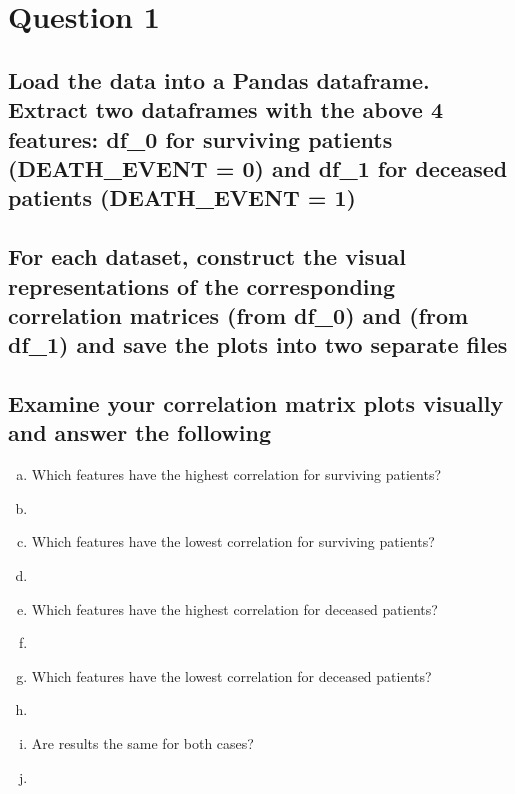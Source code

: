 \documentclass[../../assignment4.tex]{subfiles}
\begin{document}
    \section{Question 1} \label{sec:question1}


    \subsection{Load the data into a Pandas dataframe. Extract two dataframes with the above 4 features: df\_0 for surviving patients (DEATH\_EVENT = 0) and df\_1 for deceased patients (DEATH\_EVENT = 1)} \label{subsec:question1.1}


    \subsection{For each dataset, construct the visual representations of the corresponding correlation matrices  (from df\_0) and  (from df\_1) and save the plots into two separate files} \label{subsec:question1.2}


    \subsection{Examine your correlation matrix plots visually and answer the following} \label{subsec:question1.3}


    \begin{enumerate}[(a)]
        \item Which features have the highest correlation for surviving patients?
        \item[] 
        \item Which features have the lowest correlation for surviving patients?
        \item[] 
        \item Which features have the highest correlation for deceased patients?
        \item[] 
        \item Which features have the lowest correlation for deceased patients?
        \item[] 
        \item Are results the same for both cases?
        \item[] 
    \end{enumerate}
\end{document}
